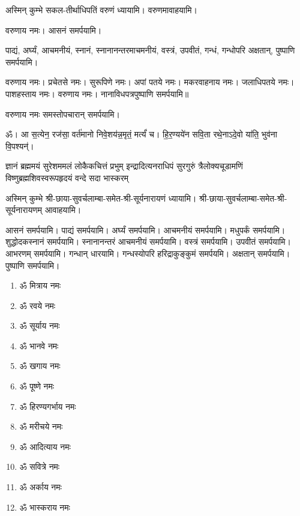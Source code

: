 अस्मिन् कुम्भे सकल-तीर्थाधिपतिं वरुणं ध्यायामि। वरुणमावाहयामि।

वरुणाय नमः। आसनं समर्पयामि।

पाद्यं, अर्घ्यं, आचमनीयं, स्नानं, स्नानानन्तरमाचमनीयं, वस्त्रं, उपवीतं, गन्धं, गन्धोपरि अक्षतान्, पुष्पाणि समर्पयामि।

वरुणाय नमः। प्रचेतसे नमः। सुरूपिणे नमः। अपां पतये नमः। मकरवाहनाय नमः। जलाधिपतये नमः। पाशहस्ताय नमः। वरुणाय नमः। नानाविधपत्रपुष्पाणि समर्पयामि॥

वरुणाय नमः समस्तोपचारान् समर्पयामि।

ॐ। आ स॒त्येन॒ रज॑सा॒ वर्त॑मानो निवे॒शय॑न्न॒मृतं॒ मर्त्यं॑ च। हि॒र॒ण्यये॑न सवि॒ता रथे॒नाऽदे॒वो या॑ति॒ भुव॑ना वि॒पश्यन्॑। 

{ज्ञानं ब्रह्ममयं सुरेशममलं लोकैकचित्तं प्रभुम्}
{इन्द्रादित्यनराधिपं सुरगुरुं त्रैलोक्यचूडामणिं}
{विष्णुब्रह्मशिवस्वरूपहृदयं वन्दे सदा भास्करम्}

अस्मिन् कुम्भे श्री-छाया-सुवर्चलाम्बा-समेत-श्री-सूर्यनारायणं ध्यायामि। श्री-छाया-सुवर्चलाम्बा-समेत-श्री-सूर्यनारायणम् आवाहयामि।

आसनं समर्पयामि। पाद्यं समर्पयामि। अर्घ्यं समर्पयामि। आचमनीयं समर्पयामि। मधुपर्कं समर्पयामि। शुद्धोदकस्नानं समर्पयामि। स्नानानन्तरं आचमनीयं समर्पयामि। वस्त्रं समर्पयामि। उपवीतं समर्पयामि। आभरणम् समर्पयामि। गन्धान् धारयामि। गन्धस्योपरि हरिद्राकुङ्कुमं समर्पयमि। अक्षतान् समर्पयामि। पुष्पाणि समर्पयामि।


\begin{multicols}{2}
\begin{enumerate}
\item ॐ मित्राय नमः
\item ॐ रवये नमः
\item ॐ सूर्याय नमः
\item ॐ भानवे नमः
\item ॐ खगाय नमः
\item ॐ पूष्णे नमः
\item ॐ हिरण्यगर्भाय नमः
\item ॐ मरीचये नमः
\item ॐ आदित्याय नमः
\item ॐ सवित्रे नमः
\item ॐ अर्काय नमः
\item ॐ भास्कराय नमः

\end{enumerate}
\end{multicols}

